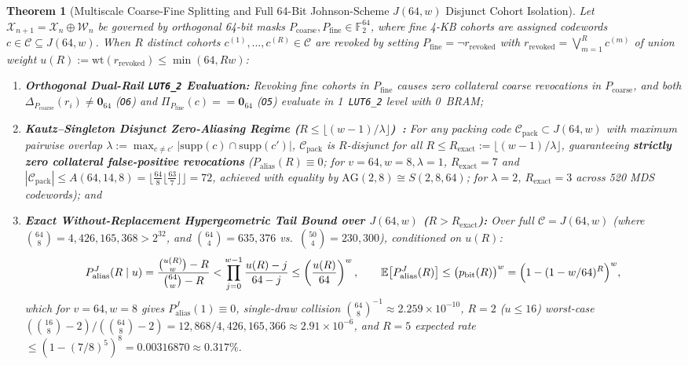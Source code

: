 \documentclass[10pt,twocolumn]{article}
\theoremstyle{spectralthm}
\newtheorem{theorem}{Theorem}[section]
\begin{document}
\begin{theorem}[Multiscale Coarse-Fine Splitting and Full 64-Bit Johnson-Scheme $J(64,w)$ Disjunct Cohort Isolation]
\label{thm:johnson}
\label{thm:multiscale}
Let $\mathcal{X}_{n+1} = \mathcal{X}_n \oplus \mathcal{W}_n$ be governed by orthogonal 64-bit masks $P_{\mathrm{coarse}}, P_{\mathrm{fine}} \in \mathbb{F}_2^{64}$, where fine 4-KB cohorts are assigned codewords $c \in \mathcal{C} \subseteq J(64,w)$. When $R$ distinct cohorts $c^{(1)},\ldots,c^{(R)} \in \mathcal{C}$ are revoked by setting $P_{\mathrm{fine}} = \neg r_{\mathrm{revoked}}$ with $r_{\mathrm{revoked}} = \bigvee_{m=1}^R c^{(m)}$ of union weight $u(R) := \mathrm{wt}(r_{\mathrm{revoked}}) \le \min(64, Rw)$:
\begin{enumerate}
  \item[(i)] \textbf{Orthogonal Dual-Rail \texttt{LUT6\_2} Evaluation:} Revoking fine cohorts in $P_{\mathrm{fine}}$ causes zero collateral coarse revocations in $P_{\mathrm{coarse}}$, and both $\Delta_{P_{\mathrm{coarse}}}(r_i) \neq \mathbf{0}_{64}$ (\texttt{O6}) and $\Pi_{P_{\mathrm{fine}}}(c) == \mathbf{0}_{64}$ (\texttt{O5}) evaluate in 1~\texttt{LUT6\_2} level with 0~BRAM;
  \item[(ii)] \textbf{Kautz--Singleton Disjunct Zero-Aliasing Regime ($R \le \lfloor (w-1)/\lambda \rfloor$)~\cite{kautz1964nonrandom}:} For any packing code $\mathcal{C}_{\mathrm{pack}} \subset J(64,w)$ with maximum pairwise overlap $\lambda := \max_{c \neq c'} |\mathrm{supp}(c) \cap \mathrm{supp}(c')|$, $\mathcal{C}_{\mathrm{pack}}$ is $R$-disjunct for all $R \le R_{\mathrm{exact}} := \lfloor (w-1)/\lambda \rfloor$, guaranteeing \textbf{strictly zero collateral false-positive revocations} ($P_{\mathrm{alias}}(R) \equiv 0$; for $v=64, w=8, \lambda=1$, $R_{\mathrm{exact}} = 7$ and $|\mathcal{C}_{\mathrm{pack}}| \le A(64,14,8) = \lfloor \frac{64}{8}\lfloor \frac{63}{7}\rfloor \rfloor = 72$, achieved with equality by $\mathrm{AG}(2,8) \cong S(2,8,64)$; for $\lambda = 2$, $R_{\mathrm{exact}} = 3$ across 520 MDS codewords); and
  \item[(iii)] \textbf{Exact Without-Replacement Hypergeometric Tail Bound over $J(64,w)$ ($R > R_{\mathrm{exact}}$):} Over full $\mathcal{C} = J(64,w)$ (where $\binom{64}{8} = 4,426,165,368 > 2^{32}$, and $\binom{64}{4} = 635,376$ vs.\ $\binom{50}{4} = 230,300$), conditioned on $u(R)$:
  \begin{equation}
  \label{eq:hypergeom}
  P_{\mathrm{alias}}^J(R \mid u) = \frac{\binom{u(R)}{w} - R}{\binom{64}{w} - R} < \prod_{j=0}^{w-1} \frac{u(R)-j}{64-j} \le \left(\frac{u(R)}{64}\right)^w,\qquad
  \mathbb{E}\bigl[P_{\mathrm{alias}}^J(R)\bigr] \le \bigl(p_{\mathrm{bit}}(R)\bigr)^w = \Bigl(1 - (1 - w/64)^R\Bigr)^w,
  \end{equation}
  which for $v = 64, w = 8$ gives $P_{\mathrm{alias}}^J(1) \equiv 0$, single-draw collision $\binom{64}{8}^{-1} \approx 2.259 \times 10^{-10}$, $R = 2$ ($u \le 16$) worst-case $(\binom{16}{8} - 2)/(\binom{64}{8} - 2) = 12,868 / 4,426,165,366 \approx 2.91 \times 10^{-6}$, and $R = 5$ expected rate $\le (1 - (7/8)^5)^8 = 0.00316870 \approx 0.317\%$.
\end{enumerate}
\end{theorem}
\end{document}
